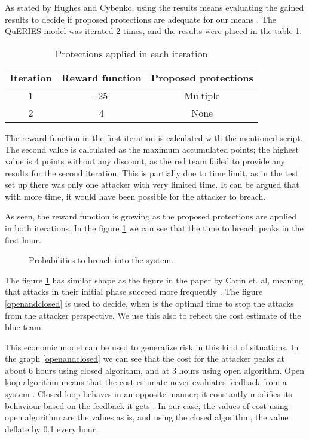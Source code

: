 As stated by Hughes and Cybenko, using the results means evaluating
the gained results to decide if proposed protections are adequate for
our means \cite{hughes2013quantitative}. The QuERIES model was
iterated 2 times, and the results were placed in the table \ref{iterationtable}.

\begin{table}[b!]
\centering
\begin{tabular}{|c|c|c|}
  \hline Iteration & Reward function & Proposed protections \\ \hline
  1 & -25 & Multiple \\ \hline 2 & 4 & None \\ \hline
\end{tabular}
\caption{Protections applied in each iteration}
\label{iterationtable}
\end{table}

The reward function in the first iteration is calculated with the
mentioned script. The second value is calculated
as the maximum accumulated points; the highest value is 4 points
without any discount, as the red team failed to provide any results
for the second iteration. This is partially due to time limit, as in
the test set up there was only one attacker with very limited time. It
can be argued that with more time, it would have been possible for the
attacker to breach.

As seen, the reward function is growing as the proposed protections
are applied in both iterations. In the figure \ref{timetobreach} we can see that the time to breach peaks in the
first hour.

\begin{figure}[t!]
\centerline{}
\caption{Probabilities to breach into the system.}
\label{timetobreach}
\end{figure}

The figure \ref{timetobreach} has similar
shape as the figure in the paper by Carin et. al, meaning that attacks
in their initial phase succeed more frequently \cite{carin2008cybersecurity}. The figure \ref{openandclosed} is
used to decide, when is the optimal time to stop the attacks from the
attacker perspective. We use this also to reflect the cost estimate of
the blue team.

This economic model can be used to generalize risk in this kind of
situations. In the graph \ref{openandclosed} we can see that
the cost for the attacker peaks at about 6 hours using closed algorithm, and
at 3 hours using open algorithm. Open loop algorithm means that the cost
estimate never evaluates feedback from a system
\cite{bars2006theory}. Closed loop behaves in an opposite manner; it
constantly modifies its behaviour based on the feedback it gets
\cite{bars2006theory}. In our case, the values of cost using open
algorithm are the values as is, and using the closed algorithm, the
value deflate by 0.1 every hour. 

